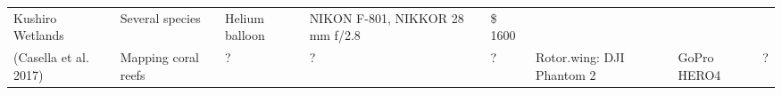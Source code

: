 \documentclass[]{interact}
\theoremstyle{plain}%
\theoremstyle{definition}
\theoremstyle{remark}
\begin{document}
\begin{longtable}[]{@{}llllllll@{}}
\begin{minipage}[t]{0.14\columnwidth}
Kushiro Wetlands\strut
\end{minipage} & \begin{minipage}[t]{0.10\columnwidth}\raggedright\strut
Several species\strut
\end{minipage} & \begin{minipage}[t]{0.09\columnwidth}\raggedright\strut
Helium balloon\strut
\end{minipage} & \begin{minipage}[t]{0.11\columnwidth}\raggedright\strut
NIKON F-801, NIKKOR 28 mm f/2.8\strut
\end{minipage} & \begin{minipage}[t]{0.01\columnwidth}\raggedright\strut
\$ 1600\strut
\end{minipage}\tabularnewline
\begin{minipage}[t]{0.11\columnwidth}\raggedright\strut
(Casella et al. 2017)\strut
\end{minipage} & \begin{minipage}[t]{0.18\columnwidth}\raggedright\strut
Mapping coral reefs\strut
\end{minipage} & \begin{minipage}[t]{0.03\columnwidth}\raggedright\strut
?\strut
\end{minipage} & \begin{minipage}[t]{0.14\columnwidth}\raggedright\strut
?\strut
\end{minipage} & \begin{minipage}[t]{0.10\columnwidth}\raggedright\strut
?\strut
\end{minipage} & \begin{minipage}[t]{0.09\columnwidth}\raggedright\strut
Rotor.wing: DJI Phantom 2\strut
\end{minipage} & \begin{minipage}[t]{0.11\columnwidth}\raggedright\strut
GoPro HERO4\strut
\end{minipage} & \begin{minipage}[t]{0.01\columnwidth}\raggedright\strut
?\strut
\end{minipage}\tabularnewline
\bottomrule
\end{longtable}
\end{document}
